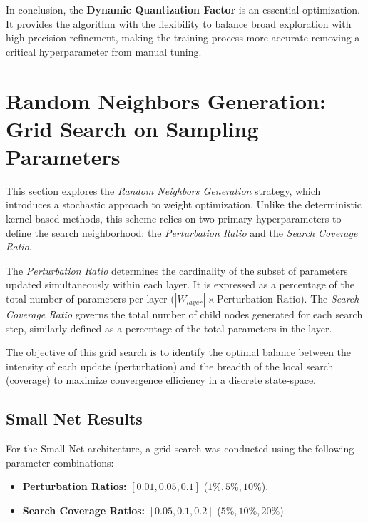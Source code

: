 In conclusion, the \textbf{Dynamic Quantization Factor} is an essential optimization. It provides the algorithm with the flexibility to balance broad exploration with high-precision refinement, making the training process more accurate removing a critical hyperparameter from manual tuning.


\newpage

\section{Random Neighbors Generation: Grid Search on Sampling Parameters}
\label{sec:random_sampling_study}

This section explores the \textit{Random Neighbors Generation} strategy, which introduces a stochastic approach to weight optimization. Unlike the deterministic kernel-based methods, this scheme relies on two primary hyperparameters to define the search neighborhood: the \textit{Perturbation Ratio} and the \textit{Search Coverage Ratio}.

The \textit{Perturbation Ratio} determines the cardinality of the subset of parameters updated simultaneously within each layer. It is expressed as a percentage of the total number of parameters per layer ($|W_{layer}| \times \text{Perturbation Ratio}$). The \textit{Search Coverage Ratio} governs the total number of child nodes generated for each search step, similarly defined as a percentage of the total parameters in the layer. 

The objective of this grid search is to identify the optimal balance between the intensity of each update (perturbation) and the breadth of the local search (coverage) to maximize convergence efficiency in a discrete state-space.

\subsection{Small Net Results}

For the Small Net architecture, a grid search was conducted using the following parameter combinations:
\begin{itemize}
    \item \textbf{Perturbation Ratios:} $[0.01, 0.05, 0.1]$ ($1\%, 5\%, 10\%$).
    \item \textbf{Search Coverage Ratios:} $[0.05, 0.1, 0.2]$ ($5\%, 10\%, 20\%$).
\end{itemize}

